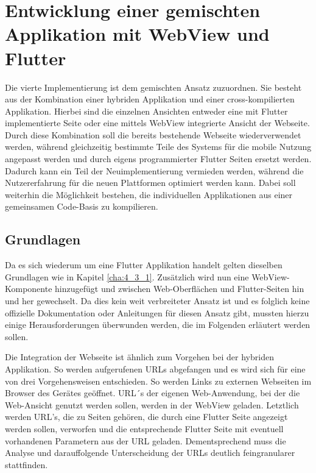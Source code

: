 \section{Entwicklung einer gemischten Applikation mit WebView und Flutter}
Die vierte Implementierung ist dem gemischten Ansatz zuzuordnen. Sie besteht aus der Kombination einer hybriden Applikation und einer cross-kompilierten Applikation.
Hierbei sind die einzelnen Ansichten entweder eine mit Flutter implementierte Seite oder eine mittels WebView integrierte Ansicht der Webseite.
Durch diese Kombination soll die bereits bestehende Webseite wiederverwendet werden, während gleichzeitig bestimmte Teile des Systems für die mobile Nutzung angepasst werden und durch eigens programmierter Flutter Seiten ersetzt werden.
Dadurch kann ein Teil der Neuimplementierung vermieden werden, während die Nutzererfahrung für die neuen Plattformen optimiert werden kann.
Dabei soll weiterhin die Möglichkeit bestehen, die individuellen Applikationen aus einer gemeinsamen Code-Basis zu kompilieren.

\subsection{Grundlagen}
Da es sich wiederum um eine Flutter Applikation handelt gelten dieselben Grundlagen wie in Kapitel \ref{cha:4_3_1}.
Zusätzlich wird nun eine WebView-Komponente hinzugefügt und zwischen Web-Oberflächen und Flutter-Seiten hin und her gewechselt.
Da dies kein weit verbreiteter Ansatz ist und es folglich keine offizielle Dokumentation oder Anleitungen für diesen Ansatz gibt, mussten hierzu einige Herausforderungen überwunden werden, die im Folgenden erläutert werden sollen.

Die Integration der Webseite ist ähnlich zum Vorgehen bei der hybriden Applikation. So werden aufgerufenen URLs abgefangen und es wird sich für eine von drei Vorgehensweisen entschieden. So werden Links zu externen Webseiten im Browser des Gerätes geöffnet. URL´s der eigenen Web-Anwendung, bei der die Web-Ansicht genutzt werden sollen, werden in der WebView geladen. Letztlich werden URL's, die zu Seiten gehören, die durch eine Flutter Seite angezeigt werden sollen, verworfen und die entsprechende Flutter Seite mit eventuell vorhandenen Parametern aus der URL geladen. 
Dementsprechend muss die Analyse und darauffolgende Unterscheidung der URLs deutlich feingranularer stattfinden.

